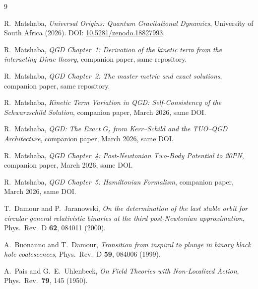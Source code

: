 \documentclass[11pt,a4paper]{article}
\theoremstyle{plain}
\theoremstyle{definition}
\theoremstyle{remark}
\begin{document}
\begin{thebibliography}{9}

R.~Matshaba,
\textit{Universal Origins: Quantum Gravitational Dynamics},
University of South Africa (2026).
DOI: \href{https://doi.org/10.5281/zenodo.18827993}{10.5281/zenodo.18827993}.

R.~Matshaba,
\textit{QGD Chapter~1: Derivation of the kinetic term from the interacting Dirac theory},
companion paper, same repository.

R.~Matshaba,
\textit{QGD Chapter~2: The master metric and exact solutions},
companion paper, same repository.

R.~Matshaba,
\textit{Kinetic Term Variation in QGD: Self-Consistency of the Schwarzschild Solution},
companion paper, March 2026, same DOI.

R.~Matshaba,
\textit{QGD: The Exact $G_t$ from Kerr--Schild and the TUO--QGD Architecture},
companion paper, March 2026, same DOI.

R.~Matshaba,
\textit{QGD Chapter~4: Post-Newtonian Two-Body Potential to 20PN},
companion paper, March 2026, same DOI.

R.~Matshaba,
\textit{QGD Chapter~5: Hamiltonian Formalism},
companion paper, March 2026, same DOI.

T.~Damour and P.~Jaranowski,
\textit{On the determination of the last stable orbit for circular general relativistic
binaries at the third post-Newtonian approximation},
Phys.\ Rev.\ D \textbf{62}, 084011 (2000).

A.~Buonanno and T.~Damour,
\textit{Transition from inspiral to plunge in binary black hole coalescences},
Phys.\ Rev.\ D \textbf{59}, 084006 (1999).

A.~Pais and G.~E.~Uhlenbeck,
\textit{On Field Theories with Non-Localized Action},
Phys.\ Rev.\ \textbf{79}, 145 (1950).

\end{thebibliography}
\end{document}
